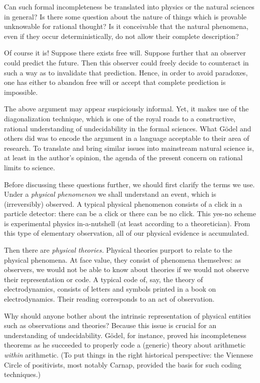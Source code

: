 Can such formal incompleteness be translated into physics or the
natural sciences in general? Is there some question about the nature of
things which is provable unknowable for rational thought?
Is it conceivable that the natural phenomena, even if they occur
deterministically, do not allow their complete description?

Of course it is!
Suppose there exists free will. Suppose further that an observer could
predict the future. Then this observer could freely decide to
counteract in such a way as to invalidate that prediction.
Hence, in order to avoid paradoxes, one has either to abandon free
will or accept that complete prediction is impossible.

The above argument may appear suspiciously informal.
Yet, it makes use of the diagonalization
technique, which is one of the royal roads to a
constructive, rational
understanding of undecidability in the formal sciences. What G\"odel
and others did was to encode the argument in a language acceptable to
their area of research.
To translate and bring similar issues into mainstream natural science
is, at least in the author's opinion, the agenda of the present concern
on rational limits to science.


Before discussing these questions further, we should first clarify the
terms we use. Under a {\em physical phenomenon} we shall understand an
event, which is (irreversibly) observed. A typical physical phenomenon
consists of a click in a particle detector: there can be a click or
there can be
no click. This yes-no scheme is experimental physics in-a-nutshell (at
least according to a theoretician). From
this type of elementary observation, all of our physical
evidence is accumulated.

Then there are {\em physical theories.} Physical theories purport to
relate to the physical phenomena. At face value, they
consist of phenomena themselves: as observers, we would not be
able to know about theories if we would not observe their
representation or code. A typical code of, say, the theory
of electrodynamics, consists of letters and symbols
printed in a book
on electrodynamics.
Their reading  corresponds to an act of observation.

Why should anyone bother about the intrinsic representation of physical
entities such as observations and theories? Because
this issue is crucial for an understanding of
undecidability.
G\"odel, for instance, proved his incompleteness theorems as
he succeeded to properly code a (generic) theory about arithmetic {\em
within} arithmetic. (To put things in the right historical
perspective: the Viennese
Circle of positivists, most notably Carnap,
provided the basis for such coding techniques.)

